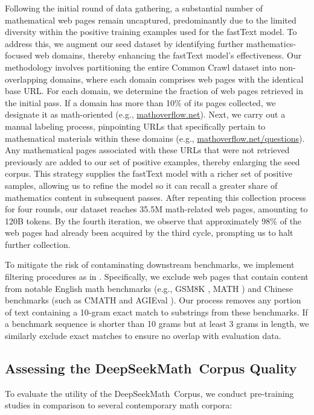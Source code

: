 Following the initial round of data gathering, a substantial number of mathematical web pages remain uncaptured, predominantly due to the limited diversity within the positive training examples used for the fastText model. To address this, we augment our seed dataset by identifying further mathematics-focused web domains, thereby enhancing the fastText model's effectiveness. Our methodology involves partitioning the entire Common Crawl dataset into non-overlapping domains, where each domain comprises web pages with the identical base URL. For each domain, we determine the fraction of web pages retrieved in the initial pass. If a domain has more than 10\% of its pages collected, we designate it as math-oriented (e.g., \url{mathoverflow.net}).
Next, we carry out a manual labeling process, pinpointing URLs that specifically pertain to mathematical materials within these domains (e.g., \url{mathoverflow.net/questions}). Any mathematical pages associated with these URLs that were not retrieved previously are added to our set of positive examples, thereby enlarging the seed corpus. This strategy supplies the fastText model with a richer set of positive samples, allowing us to refine the model so it can recall a greater share of mathematics content in subsequent passes. After repeating this collection process for four rounds, our dataset reaches 35.5M math-related web pages, amounting to 120B tokens. By the fourth iteration, we observe that approximately 98\% of the web pages had already been acquired by the third cycle, prompting us to halt further collection.

To mitigate the risk of contaminating downstream benchmarks, we implement filtering procedures as in \cite{deepseek-coder}. Specifically, we exclude web pages that contain content from notable English math benchmarks (e.g., GSM8K \citep{gsm8k}, MATH \citep{MATH}) and Chinese benchmarks (such as CMATH \citep{wei2023cmath} and AGIEval \citep{agieval}). Our process removes any portion of text containing a 10-gram exact match to substrings from these benchmarks. If a benchmark sequence is shorter than 10 grams but at least 3 grams in length, we similarly exclude exact matches to ensure no overlap with evaluation data.

\subsection{Assessing the DeepSeekMath~Corpus Quality}

To evaluate the utility of the DeepSeekMath~Corpus, we conduct pre-training studies in comparison to several contemporary math corpora:

